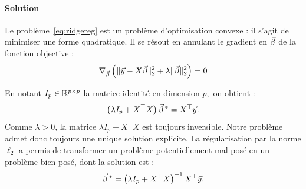 \paragraph{Solution}
Le problème~\eqref{eq:ridgereg} est un problème d'optimisation convexe : il s'agit de minimiser une forme
quadratique. Il se résout en annulant le gradient en $\bbeta$ de la fonction
objective :
\begin{equation}
  \nabla_{\bbeta} \left( \ltwonorm{\yy - X \bbeta}^2 + 
    \lambda \ltwonorm{\bbeta}^2 \right) = 0
\end{equation}

En notant $I_p \in \mathbb{R}^{p \times p}$ la matrice identité en dimension $p,$ on
obtient :
\begin{equation}
  \left( \lambda I_p + X^\top X  \right) \bbeta^* = X^\top \yy.
\end{equation}
Comme $\lambda > 0$, la matrice $\lambda I_p + X^\top X$ est toujours
inversible. Notre problème admet donc toujours une unique solution
explicite. La régularisation par la norme $\ell_2$ a permis de transformer un
problème potentiellement mal posé en un problème bien posé, dont la solution
est :
\begin{equation}
  \label{eq:ridgereg_sol}
  \bbeta^* =  \left( \lambda I_p + X^\top X  \right)^{-1} X^\top \yy.
\end{equation}
  


